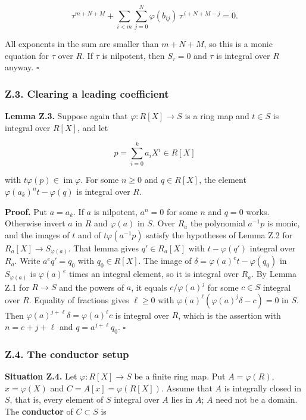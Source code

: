 \documentclass[11pt]{article}
\begin{document}
\[
\tau^{m+N+M}+\sum_{i<m}\sum_{j=0}^{N}\varphi(b_{ij})\,\tau^{\,i+N+M-j}=0 .
\]

All exponents in the sum are smaller than \(m+N+M\), so this is a monic
equation for \(\tau\) over \(R\). If \(\tau\) is nilpotent, then
\(S_\tau=0\) and \(\tau\) is integral over \(R\) anyway. \(\square\)

\subsubsection{Z.3. Clearing a leading
coefficient}\label{z.3.-clearing-a-leading-coefficient}

\textbf{Lemma Z.3.} Suppose again that \(\varphi:R[X]\to S\) is a ring
map and \(t\in S\) is integral over \(R[X]\), and let

\[
p=\sum_{i=0}^ka_iX^i\in R[X]
\]

with \(t\varphi(p)\in\operatorname{im}\varphi\). For some \(n\ge0\) and
\(q\in R[X]\), the element \(\varphi(a_k)^nt-\varphi(q)\) is integral
over \(R\).

\textbf{Proof.} Put \(a=a_k\). If \(a\) is nilpotent, \(a^n=0\) for some
\(n\) and \(q=0\) works. Otherwise invert \(a\) in \(R\) and
\(\varphi(a)\) in \(S\). Over \(R_a\) the polynomial \(a^{-1}p\) is
monic, and the images of \(t\) and of \(t\varphi(a^{-1}p)\) satisfy the
hypotheses of Lemma Z.2 for \(R_a[X]\to S_{\varphi(a)}\). That lemma
gives \(q'\in R_a[X]\) with \(t-\varphi(q')\) integral over \(R_a\).
Write \(a^eq'=q_0\) with \(q_0\in R[X]\). The image of
\(\delta=\varphi(a)^et-\varphi(q_0)\) in \(S_{\varphi(a)}\) is
\(\varphi(a)^e\) times an integral element, so it is integral over
\(R_a\). By Lemma Z.1 for \(R\to S\) and the powers of \(a\), it equals
\(c/\varphi(a)^j\) for some \(c\in S\) integral over \(R\). Equality of
fractions gives \(\ell\ge0\) with
\(\varphi(a)^{\ell}(\varphi(a)^j\delta-c)=0\) in \(S\). Then
\(\varphi(a)^{j+\ell}\delta=\varphi(a)^\ell c\) is integral over \(R\),
which is the assertion with \(n=e+j+\ell\) and \(q=a^{j+\ell}q_0\).
\(\square\)

\subsubsection{Z.4. The conductor setup}\label{z.4.-the-conductor-setup}

\textbf{Situation Z.4.} Let \(\varphi:R[X]\to S\) be a finite ring map.
Put \(A=\varphi(R)\), \(x=\varphi(X)\) and \(C=A[x]=\varphi(R[X])\).
Assume that \(A\) is integrally closed in \(S\), that is, every element
of \(S\) integral over \(A\) lies in \(A\); \(A\) need not be a domain.
The \textbf{conductor} of \(C\subset S\) is
\end{document}
